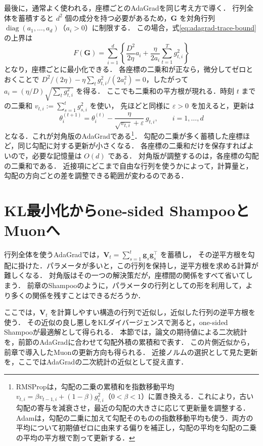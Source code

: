 \documentclass[../main.tex]{subfiles}
\begin{document}
最後に，通常よく使われる，座標ごとのAdaGradを同じ考え方で導く．
行列全体を蓄積すると $d^2$ 個の成分を持つ必要があるため，$\bm{G}$ を対角行列
$\operatorname{diag}(a_1,\ldots,a_d)$（$a_i>0$）に制限する．
この場合，式\eqref{eq:adagrad-trace-bound}の上界は
\begin{equation}
  F(\bm{G})
  =\sum_{i=1}^d\left\{\frac{D^2}{2\eta}a_i
  +\frac{\eta}{2a_i}\sum_{t=1}^Tg_{t,i}^2\right\}
  \label{eq:adagrad-diagonal-objective}
\end{equation}
となり，座標ごとに最小化できる．
各座標の二乗和が正なら，微分してゼロとおくことで
$D^2/(2\eta)-\eta\sum_tg_{t,i}^2/(2a_i^2)=0$，したがって
$a_i=(\eta/D)\sqrt{\sum_tg_{t,i}^2}$ を得る．
ここでも二乗和の平方根が現れる．時刻 $t$ までの二乗和 $v_{t,i}:=\sum_{s=1}^t g_{s,i}^2$ を使い，
先ほどと同様に $\varepsilon>0$ を加えると，更新は
\begin{equation}
  \theta_i^{(t+1)}
  =\theta_i^{(t)}
  -\frac{\eta}{\sqrt{v_{t,i}}+\varepsilon}\,g_{t,i},
  \qquad i=1,\ldots,d
  \label{eq:adagrad-diagonal-update}
\end{equation}
となる．これが対角版のAdaGradである\footnote{RMSProp\cite{tieleman2012rmsprop}は，勾配の二乗の累積和を指数移動平均 $v_{t,i}=\beta v_{t-1,i}+(1-\beta)g_{t,i}^2$（$0<\beta<1$）に置き換える．これにより，古い勾配の寄与を減衰させ，最近の勾配の大きさに応じて更新量を調整する．Adam\cite{kingma2015adam}は，勾配の二乗に加えて勾配そのものの指数移動平均も使う．両方の平均について初期値ゼロに由来する偏りを補正し，勾配の平均を勾配の二乗の平均の平方根で割って更新する．}．
勾配の二乗が多く蓄積した座標ほど，同じ勾配に対する更新が小さくなる．
各座標の二乗和だけを保存すればよいので，必要な記憶量は $O(d)$ である．
対角版が調整するのは，各座標の勾配の二乗和である．
近接項にどこまで自由な行列を使うかによって，計算量と，勾配の方向ごとの差を調整できる範囲が変わるのである．

\section{KL最小化からone-sided ShampooとMuonへ}
\label{sec:adagrad-kl}

行列全体を使うAdaGradでは，$\bm{V}_t=\sum_{s=1}^t\bm{g}_s\bm{g}_s^\top$ を蓄積し，
その逆平方根を勾配に掛けた．パラメータが多いと，この行列を保持し，逆平方根を求める計算が難しくなる．
対角版はその一つの解決策だが，座標間の関係をすべて省いてしまう．
前章のShampooのように，パラメータの行列としての形を利用して，より多くの関係を残すことはできるだろうか．

ここでは，$\bm{V}_t$ を計算しやすい構造の行列で近似し，近似した行列の逆平方根を使う．
その近似の良し悪しをKLダイバージェンスで測ると，one-sided Shampooが最適解として得られる\cite{lin2026klshampoo}．
本節では，論文の期待値による二次統計を，前節のAdaGradに合わせて勾配外積の累積和で表す．
この片側近似から，前章で導入したMuonの更新方向も得られる．
近接ノルムの選択として見た更新を，ここではAdaGradの二次統計の近似として捉え直す．
\end{document}
